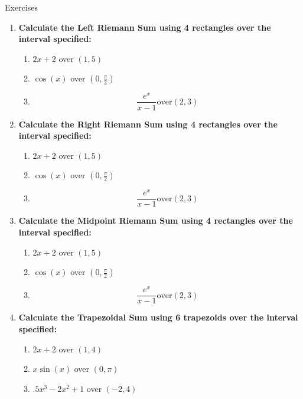 \documentclass[../revisedmain.tex]{subfiles}
\begin{document}
\begin{center}
\LARGE Exercises
\end{center}
\begin{enumerate}
	\item \textbf{Calculate the Left Riemann Sum using 4 rectangles over the interval specified:}
	\begin{enumerate}
		\item $2x+2$ over $(1,5)$
		\item $\cos(x)$ over $(0,\frac{\pi}{2})$
		\item $$\frac{e^x}{x-1} \text{over} (2,3)$$
	\end{enumerate}
	\item \textbf{Calculate the Right Riemann Sum using 4 rectangles over the interval specified:}
	\begin{enumerate}
		\item $2x+2$ over $(1,5)$
		\item $\cos(x)$ over $(0,\frac{\pi}{2})$
		\item $$\frac{e^x}{x-1} \text{over} (2,3)$$
	\end{enumerate}
	\item \textbf{Calculate the Midpoint Riemann Sum using 4 rectangles over the interval specified:}
	\begin{enumerate}
		\item $2x+2$ over $(1,5)$
		\item $\cos(x)$ over $(0,\frac{\pi}{2})$
		\item $$\frac{e^x}{x-1} \text{over} (2,3)$$
	\end{enumerate}
	\item \textbf{Calculate the Trapezoidal Sum using 6 trapezoids over the interval specified:}
	\begin{enumerate}
		\item $2x+2$ over $(1,4)$
		\item $x\sin(x)$ over $(0,\pi)$
		\item $.5x^3-2x^2+1$ over $(-2,4)$
	\end{enumerate}
\end{enumerate}
\end{document}
